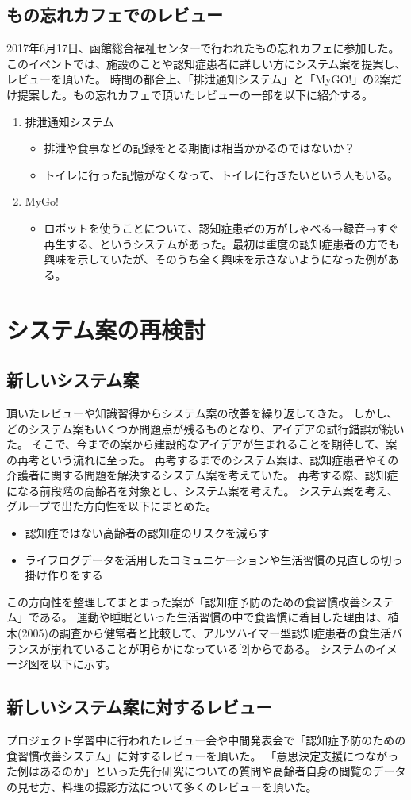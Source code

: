 \documentclass[../report]{subfiles}
\begin{document}
\subsection{もの忘れカフェでのレビュー}
2017年6月17日、函館総合福祉センターで行われたもの忘れカフェに参加した。
このイベントでは、施設のことや認知症患者に詳しい方にシステム案を提案し、レビューを頂いた。
時間の都合上、「排泄通知システム」と「MyGO!」の2案だけ提案した。もの忘れカフェで頂いたレビューの一部を以下に紹介する。
\begin{enumerate}
    \item 排泄通知システム
        \begin{itemize}
            \item 排泄や食事などの記録をとる期間は相当かかるのではないか？
            \item トイレに行った記憶がなくなって、トイレに行きたいという人もいる。
        \end{itemize}
    \item MyGo!
        \begin{itemize}
            \item ロボットを使うことについて、認知症患者の方がしゃべる→録音→すぐ再生する、というシステムがあった。最初は重度の認知症患者の方でも興味を示していたが、そのうち全く興味を示さないようになった例がある。
        \end{itemize}
\end{enumerate}


\section{システム案の再検討}
\subsection{新しいシステム案}
頂いたレビューや知識習得からシステム案の改善を繰り返してきた。
しかし、どのシステム案もいくつか問題点が残るものとなり、アイデアの試行錯誤が続いた。
そこで、今までの案から建設的なアイデアが生まれることを期待して、案の再考という流れに至った。
再考するまでのシステム案は、認知症患者やその介護者に関する問題を解決するシステム案を考えていた。
再考する際、認知症になる前段階の高齢者を対象とし、システム案を考えた。
システム案を考え、グループで出た方向性を以下にまとめた。
\begin{itemize}
    \item 認知症ではない高齢者の認知症のリスクを減らす
    \item ライフログデータを活用したコミュニケーションや生活習慣の見直しの切っ掛け作りをする
\end{itemize}
この方向性を整理してまとまった案が「認知症予防のための食習慣改善システム」である。
運動や睡眠といった生活習慣の中で食習慣に着目した理由は、植木(2005)の調査から健常者と比較して、アルツハイマー型認知症患者の食生活バランスが崩れていることが明らかになっている[2]からである。
システムのイメージ図を以下に示す。

\subsection{新しいシステム案に対するレビュー}
プロジェクト学習中に行われたレビュー会や中間発表会で「認知症予防のための食習慣改善システム」に対するレビューを頂いた。
「意思決定支援につながった例はあるのか」といった先行研究についての質問や高齢者自身の閲覧のデータの見せ方、料理の撮影方法について多くのレビューを頂いた。
\end{document}
